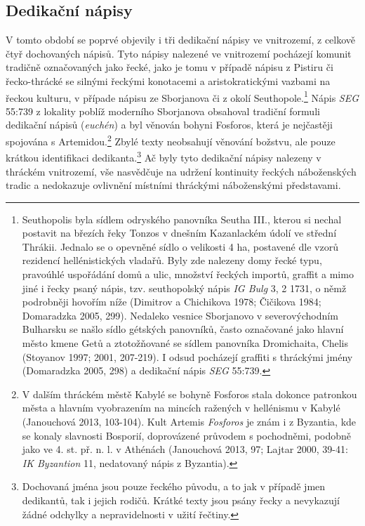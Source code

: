 
\subsection[dedikační-nápisy-4]{Dedikační nápisy}

V tomto období se poprvé objevily i tři dedikační nápisy ve vnitrozemí, z celkově čtyř dochovaných nápisů. Tyto nápisy nalezené ve vnitrozemí pocházejí komunit tradičně označovaných jako řecké, jako je tomu v případě nápisu z Pistiru či řecko-thrácké se silnými řeckými konotacemi a aristokratickými vazbami na řeckou kulturu, v případe nápisu ze Sborjanova či z okolí Seuthopole.\footnote{Seuthopolis byla sídlem odryského panovníka Seutha III., kterou si nechal postavit na březích řeky Tonzos v dnešním Kazanlackém údolí ve střední Thrákii. Jednalo se o opevněné sídlo o velikosti 4 ha, postavené dle vzorů rezidencí hellénistických vladařů. Byly zde nalezeny domy řecké typu, pravoúhlé uspořádání domů a ulic, množství řeckých importů, graffit a mimo jiné i řecky psaný nápis, tzv. seuthopolský nápis {\em IG Bulg} 3, 2 1731, o němž podrobněji hovořím níže (Dimitrov a Chichikova 1978; Čičikova 1984; Domaradzka 2005, 299). Nedaleko vesnice Sborjanovo v severovýchodním Bulharsku se našlo sídlo gétských panovníků, často označované jako hlavní město kmene Getů a ztotožňované se sídlem panovníka Dromichaita, Chelis (Stoyanov 1997; 2001, 207-219). I odsud pocházejí graffiti s thráckými jmény (Domaradzka 2005, 298) a dedikační nápis {\em SEG} 55:739.} Nápis {\em SEG} 55:739 z lokality poblíž moderního Sborjanova obsahoval tradiční formuli dedikační nápisů ({\em euchén}) a byl věnován bohyni Fosforos, která je nejčastěji spojována s Artemidou.\footnote{V dalším thráckém městě Kabylé se bohyně Fosforos stala dokonce patronkou města a hlavním vyobrazením na mincích ražených v hellénismu v Kabylé (Janouchová 2013, 103-104). Kult Artemis {\em Fosforos} je znám i z Byzantia, kde se konaly slavnosti Bosporií, doprovázené průvodem s pochodněmi, podobně jako ve 4. st. př. n. l. v Athénách (Janouchová 2013, 97; Lajtar 2000, 39-41: {\em IK Byzantion} 11, nedatovaný nápis z Byzantia).} Zbylé texty neobsahují věnování božstvu, ale pouze krátkou identifikaci dedikanta.\footnote{Dochovaná jména jsou pouze řeckého původu, a to jak v případě jmen dedikantů, tak i jejich rodičů. Krátké texty jsou psány řecky a nevykazují žádné odchylky a nepravidelnosti v užití řečtiny.} Ač byly tyto dedikační nápisy nalezeny v thráckém vnitrozemí, vše nasvědčuje na udržení kontinuity řeckých náboženských tradic a nedokazuje ovlivnění místními thráckými náboženskými představami.

